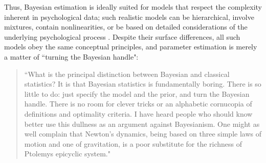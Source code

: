 Thus, Bayesian estimation is ideally suited for models that respect the complexity inherent in psychological data; such realistic models can be hierarchical, involve mixtures, contain nonlinearities, or be based on detailed considerations of the underlying psychological process \cite{LeeWagenmakersBayesBook,ShiffrinEtAl2008}. Despite their surface differences, all such models obey the same conceptual principles, and parameter estimation is merely a matter of ``turning the Bayesian handle":
\begin{quotation}
``What is the principal distinction between Bayesian and classical statistics? It is that Bayesian statistics is fundamentally boring. There is so little to do: just specify the model and the prior, and turn the Bayesian handle. There is no room for clever tricks or an alphabetic cornucopia of definitions and optimality criteria. I have heard people who should know better use this dullness as an argument against Bayesianism. One might as well complain that Newton's dynamics, being based on three simple laws of motion and one of gravitation, is a poor substitute for the richness of Ptolemys epicyclic system." \cite[p. 326]{Dawid2000Comment}
\end{quotation}

